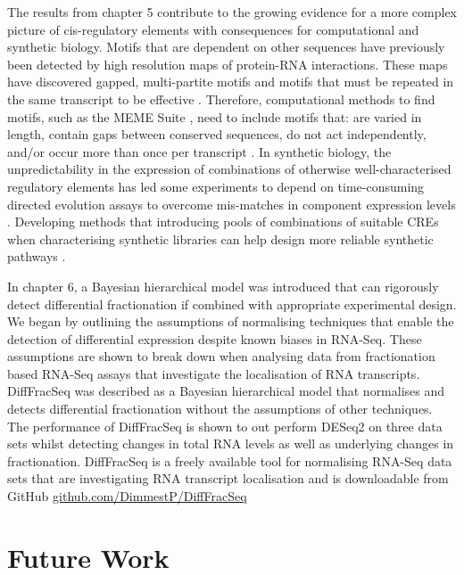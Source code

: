 \documentclass[../main.tex]{subfiles}
\begin{document}
The results from chapter 5 contribute to the growing evidence for a more complex picture of cis-regulatory elements with consequences for computational and synthetic biology.
Motifs that are dependent on other sequences have previously been detected by high resolution maps of protein-RNA interactions.
These maps have discovered gapped, multi-partite motifs \parencite{Olivier2005} and motifs that must be repeated in the same transcript to be effective \parencite{Jackson2004, Gu2004}.
Therefore, computational methods to find motifs, such as the MEME Suite \parencite{Bailey2015}, need to include motifs that: are varied in length, contain gaps between conserved sequences, do not act independently, and/or occur more than once per transcript \parencite{Frith2008}.
In synthetic biology, the unpredictability in the expression of combinations of otherwise well-characterised regulatory elements has led some experiments to depend on time-consuming directed evolution assays to overcome mis-matches in component expression levels \parencite{Yokobayashi2002}.
Developing methods that introducing pools of combinations of suitable CREs when characterising synthetic libraries can help design more reliable synthetic pathways  \parencite{Kosuri2013}.

In chapter 6, a Bayesian hierarchical model was introduced that can rigorously detect differential fractionation if combined with appropriate experimental design. 
We began by outlining the assumptions of normalising techniques that enable the detection of differential expression despite known biases in RNA-Seq.
These assumptions are shown to break down when analysing data from fractionation based RNA-Seq assays that investigate the localisation of RNA transcripts.
DiffFracSeq was described as a Bayesian hierarchical model that normalises and detects differential fractionation without the assumptions of other techniques.
The performance of DiffFracSeq is shown to out perform DESeq2 on three data sets whilst detecting changes in total RNA levels as well as underlying changes in fractionation.
DiffFracSeq is a freely available tool for normalising RNA-Seq data sets that are investigating RNA transcript localisation and is downloadable from GitHub \href{https://github.com/DimmestP/DiffFracSeq}{github.com/DimmestP/DiffFracSeq}

\section{Future Work}
\end{document}

